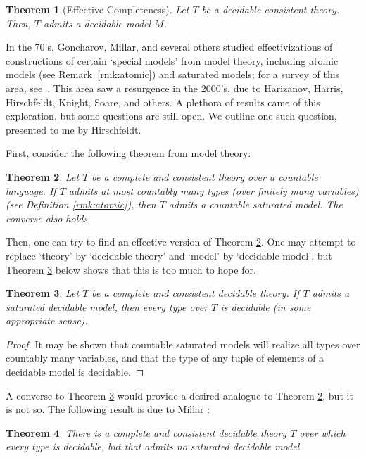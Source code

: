 \documentclass{article}
\newtheorem{theorem}{Theorem}[section]
\theoremstyle{nonumberplain}
\newtheorem{proof}{Proof}
\begin{document}
\begin{theorem}[Effective Completeness]
Let $T$ be a decidable consistent theory. Then, $T$ admits a decidable model $M$.
\end{theorem}

\smallskip

In the 70's, Goncharov, Millar, and several others studied effectivizations of constructions of certain `special models' from model theory, including atomic models (see Remark~\ref{rmk:atomic}) and saturated models; for a survey of this area, see~\cite{harizanov}. This area saw a resurgence in the 2000's, due to Harizanov, Harris, Hirschfeldt, Knight, Soare, and others. A plethora of results came of this exploration, but some questions are still open. We outline one such question, presented to me by Hirschfeldt.

First, consider the following theorem from model theory:
\begin{theorem}\label{thm:sat1}
Let $T$ be a complete and consistent theory over a countable language. If $T$ admits at most countably many types (over finitely many variables) (see Definition \ref{rmk:atomic}), then $T$ admits a countable saturated model. The converse also holds.
\end{theorem}

Then, one can try to find an effective version of Theorem \ref{thm:sat1}. One may attempt to replace `theory' by `decidable theory' and `model' by `decidable model', but Theorem \ref{thm:sat2} below shows that this is too much to hope for.

\begin{theorem}\label{thm:sat2}
Let $T$ be a complete and consistent decidable theory. If $T$ admits a saturated decidable model, then every type over $T$ is decidable (in some appropriate sense).
\end{theorem}

\begin{proof}
It may be shown that countable saturated models will realize all types over countably many variables, and that the type of any tuple of elements of a decidable model is decidable.
\end{proof}

A converse to Theorem \ref{thm:sat2} would provide a desired analogue to Theorem \ref{thm:sat1}, but it is not so. The following result is due to Millar \cite{millar}:
\begin{theorem}\label{thm:cex}
There is a complete and consistent decidable theory $T$ over which every type is decidable, but that admits no saturated decidable model.
\end{theorem}
\end{document}
